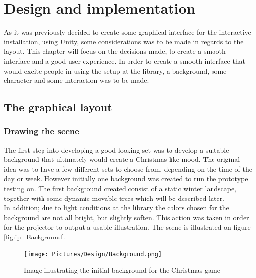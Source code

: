 \chapter{Design and implementation}
As it was previously decided to create some graphical interface for the interactive installation, using Unity, some considerations was to be made in regards to the layout. This chapter will focus on the decisions made, to create a smooth interface and a good user experience. In order to create a smooth interface that would excite people in using the setup at the library, a background, some character and some interaction was to be made.

\section{The graphical layout}
\subsection{Drawing the scene}
The first step into developing a good-looking set was to develop a suitable background that ultimately would create a Christmas-like mood. The original idea was to have a few different sets to choose from, depending on the time of the day or week. However initially one background was created to run the prototype testing on. The first background created consist of a static winter landscape, together with some dynamic movable trees which will be described later.\\
In addition; due to light conditions at the library the colors chosen for the background are not all bright, but slightly soften. This action was taken in order for the projector to output a usable illustration. The scene is illustrated on  figure \eqref{fig:ip_Background}.

\begin{figure}[htbp]
\centering
\texttt{[image: Pictures/Design/Background.png]}
\caption{Image illustrating the initial background for the Christmas game}
\label{fig:ip_Background}
\end{figure}

